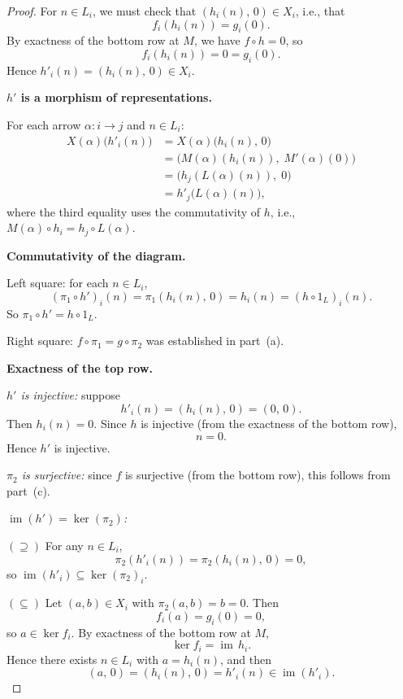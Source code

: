 \documentclass[11pt, a4paper]{article}
\begin{document}
\begin{enumerate}[leftmargin=*, label=\textbf{\arabic*.}]
\begin{enumerate}[label=(\alph*)]
\begin{proof}
    For $n\in L_i$, we must check that $(h_i(n),\,0)\in X_i$, i.e., that
    \[
    f_i(h_i(n)) = g_i(0).
    \]
    By exactness of the bottom row at $M$, we have $f\circ h = 0$, so
    \[
    f_i(h_i(n)) = 0 = g_i(0).
    \]
    Hence $h'_i(n) = (h_i(n),\,0) \in X_i$.

    \medskip\noindent\textbf{$h'$ is a morphism of representations.}
    
    For each arrow $\alpha\colon i\to j$ and $n\in L_i$:
    \begin{align*}
    X(\alpha)\bigl(h'_i(n)\bigr) &= X(\alpha)\bigl(h_i(n),\,0\bigr) \\
    &= \bigl(M(\alpha)(h_i(n)),\; M'(\alpha)(0)\bigr) \\
    &= \bigl(h_j(L(\alpha)(n)),\; 0\bigr) \\
    &= h'_j\bigl(L(\alpha)(n)\bigr),
    \end{align*}
    where the third equality uses the commutativity of $h$, i.e., $M(\alpha)\circ h_i = h_j\circ L(\alpha)$.

    \medskip\noindent\textbf{Commutativity of the diagram.}
    
    Left square: for each $n\in L_i$,
    \[
    (\pi_1\circ h')_i(n) = \pi_1(h_i(n),\,0) = h_i(n) = (h\circ 1_L)_i(n).
    \]
    So $\pi_1\circ h' = h\circ 1_L$.
    
    Right square: $f\circ\pi_1 = g\circ\pi_2$ was established in part~(a).

    \medskip\noindent\textbf{Exactness of the top row.}

    \emph{$h'$ is injective:} suppose
    \[
    h'_i(n) = (h_i(n),\,0) = (0,\,0).
    \]
    Then $h_i(n) = 0$. Since $h$ is injective (from the exactness of the bottom row),
    \[
    n = 0.
    \]
    Hence $h'$ is injective.

    \emph{$\pi_2$ is surjective:} since $f$ is surjective (from the bottom row), this follows from part~(c).

    \emph{$\operatorname{im}(h') = \ker(\pi_2)$:}

    $(\supseteq)$ For any $n\in L_i$,
    \[
    \pi_2(h'_i(n)) = \pi_2(h_i(n),\,0) = 0,
    \]
    so $\operatorname{im}(h'_i)\subseteq\ker(\pi_2)_i$.
    
    $(\subseteq)$ Let $(a,b)\in X_i$ with $\pi_2(a,b)=b=0$. Then
    \[
    f_i(a) = g_i(0) = 0,
    \]
    so $a\in\ker f_i$. By exactness of the bottom row at $M$,
    \[
    \ker f_i = \operatorname{im}\, h_i.
    \]
    Hence there exists $n\in L_i$ with $a=h_i(n)$, and then
    \[
    (a,\,0) = (h_i(n),\,0) = h'_i(n) \in \operatorname{im}(h'_i).
    \]
    

\end{proof}
\end{enumerate}
\end{enumerate}
\end{document}

